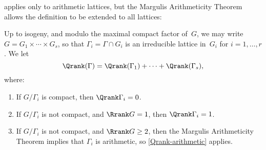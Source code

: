 %
%

 applies only to arithmetic lattices, but the Margulis Arithmeticity Theorem  allows the definition to be extended to all lattices:

\begin{defn} \label{QrankDefn}
 Up to isogeny, and modulo the maximal compact factor of~$G$,
we may write $G = G_1 \times \cdots \times G_s$, so that
$\Gamma_i = \Gamma \cap G_i$ is an irreducible lattice
in~$G_i$ for $i = 1,\ldots,r$ . We let
 $$ \Qrank(\Gamma) = \Qrank(\Gamma_1) +
\cdots + \Qrank(\Gamma_s) ,$$
 where:
	 \begin{enumerate}
	 \item If $G/\Gamma_i$ is compact, then $\Qrank \Gamma_i  = 0$.
	 \item If $G/\Gamma_i$ is not compact, and $\Rrank G = 1$, then $\Qrank \Gamma_i = 1$.
	 \item If $G/\Gamma_i$ is not compact, and $\Rrank G \ge 2$, then the Margulis Arithmeticity Theorem  implies that $\Gamma_i$ is
	arithmetic, so \cref{Qrank-arithmetic} applies.
	 \end{enumerate}
 \end{defn}




